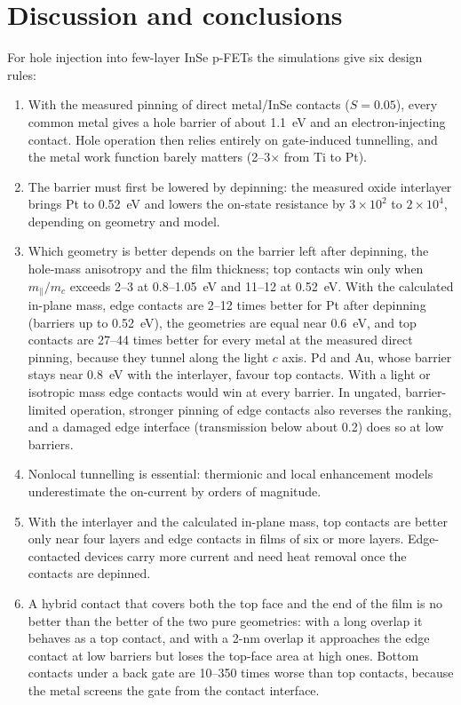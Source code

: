 \documentclass[11pt]{article}
\begin{document}
\section{Discussion and conclusions}
\label{sec:concl}
For hole injection into few-layer InSe p-FETs the simulations give six design rules:
\begin{enumerate}
\item With the measured pinning of direct metal/InSe contacts ($S=0.05$), every common metal gives a hole barrier of about 1.1~eV and an electron-injecting contact. Hole operation then relies entirely on gate-induced tunnelling, and the metal work function barely matters (2--3$\times$ from Ti to Pt).
\item The barrier must first be lowered by depinning: the measured oxide interlayer brings Pt to 0.52~eV and lowers the on-state resistance by $3\times10^2$ to $2\times10^4$, depending on geometry and model.
\item Which geometry is better depends on the barrier left after depinning, the hole-mass anisotropy and the film thickness; top contacts win only when $m_\parallel/m_c$ exceeds 2--3 at 0.8--1.05~eV and 11--12 at 0.52~eV. With the calculated in-plane mass, edge contacts are 2--12 times better for Pt after depinning (barriers up to 0.52~eV), the geometries are equal near 0.6~eV, and top contacts are 27--44 times better for every metal at the measured direct pinning, because they tunnel along the light $c$ axis. Pd and Au, whose barrier stays near 0.8~eV with the interlayer, favour top contacts. With a light or isotropic mass edge contacts would win at every barrier. In ungated, barrier-limited operation, stronger pinning of edge contacts also reverses the ranking, and a damaged edge interface (transmission below about 0.2) does so at low barriers.
\item Nonlocal tunnelling is essential: thermionic and local enhancement models underestimate the on-current by orders of magnitude.
\item With the interlayer and the calculated in-plane mass, top contacts are better only near four layers and edge contacts in films of six or more layers. Edge-contacted devices carry more current and need heat removal once the contacts are depinned.
\item A hybrid contact that covers both the top face and the end of the film is no better than the better of the two pure geometries: with a long overlap it behaves as a top contact, and with a 2-nm overlap it approaches the edge contact at low barriers but loses the top-face area at high ones. Bottom contacts under a back gate are 10--350 times worse than top contacts, because the metal screens the gate from the contact interface.
\end{enumerate}
\end{document}
